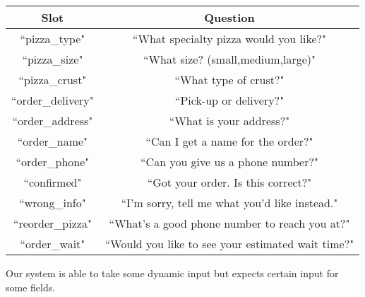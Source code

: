 \documentclass{article}
\begin{document}
\begin{tabular}{|c|c|}
\hline
Slot & Question \\\hline
``pizza\_type" & ``What specialty pizza would you like?"\\\hline
``pizza\_size" & ``What size? (small,medium,large)"\\\hline
``pizza\_crust" & ``What type of crust?"\\\hline
``order\_delivery" & ``Pick-up or delivery?"\\\hline
``order\_address" & ``What is your address?"\\\hline
``order\_name" & ``Can I get a name for the order?"\\\hline
``order\_phone" & ``Can you give us a phone number?"\\\hline
``confirmed" & ``Got your order. Is this correct?"\\\hline
``wrong\_info" & ``I'm sorry, tell me what you'd like instead."\\\hline
``reorder\_pizza" & ``What's a good phone number to reach you at?"\\\hline
``order\_wait" & ``Would you like to see your estimated wait time?"\\\hline
\end{tabular}

\vspace{.5cm}

Our system is able to take some dynamic input but expects certain input for some fields.
\end{document}
